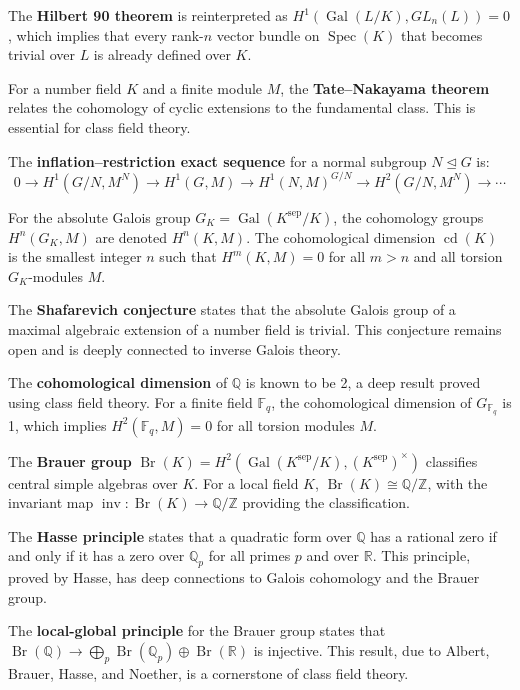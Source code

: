 The \textbf{Hilbert 90 theorem} is reinterpreted as $H^1(\operatorname{Gal}(L/K), GL_n(L)) = 0$, which implies that every rank-$n$ vector bundle on $\operatorname{Spec}(K)$ that becomes trivial over $L$ is already defined over $K$.

For a number field $K$ and a finite module $M$, the \textbf{Tate--Nakayama theorem} relates the cohomology of cyclic extensions to the fundamental class. This is essential for class field theory.

The \textbf{inflation--restriction exact sequence} for a normal subgroup $N \trianglelefteq G$ is:
\[0 \to H^1(G/N, M^N) \to H^1(G, M) \to H^1(N, M)^{G/N} \to H^2(G/N, M^N) \to \cdots\]

For the absolute Galois group $G_K = \operatorname{Gal}(K^{\text{sep}}/K)$, the cohomology groups $H^n(G_K, M)$ are denoted $H^n(K, M)$. The cohomological dimension $\operatorname{cd}(K)$ is the smallest integer $n$ such that $H^m(K, M) = 0$ for all $m > n$ and all torsion $G_K$-modules $M$.

The \textbf{Shafarevich conjecture} states that the absolute Galois group of a maximal algebraic extension of a number field is trivial. This conjecture remains open and is deeply connected to inverse Galois theory.

The \textbf{cohomological dimension} of $\mathbb{Q}$ is known to be 2, a deep result proved using class field theory. For a finite field $\mathbb{F}_q$, the cohomological dimension of $G_{\mathbb{F}_q}$ is 1, which implies $H^2(\mathbb{F}_q, M) = 0$ for all torsion modules $M$.

The \textbf{Brauer group} $\operatorname{Br}(K) = H^2(\operatorname{Gal}(K^{\text{sep}}/K), (K^{\text{sep}})^\times)$ classifies central simple algebras over $K$. For a local field $K$, $\operatorname{Br}(K) \cong \mathbb{Q}/\mathbb{Z}$, with the invariant map $\operatorname{inv}: \operatorname{Br}(K) \to \mathbb{Q}/\mathbb{Z}$ providing the classification.

The \textbf{Hasse principle} states that a quadratic form over $\mathbb{Q}$ has a rational zero if and only if it has a zero over $\mathbb{Q}_p$ for all primes $p$ and over $\mathbb{R}$. This principle, proved by Hasse, has deep connections to Galois cohomology and the Brauer group.

The \textbf{local-global principle} for the Brauer group states that $\operatorname{Br}(\mathbb{Q}) \to \bigoplus_p \operatorname{Br}(\mathbb{Q}_p) \oplus \operatorname{Br}(\mathbb{R})$ is injective. This result, due to Albert, Brauer, Hasse, and Noether, is a cornerstone of class field theory.

